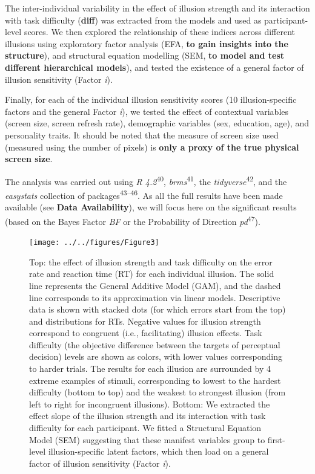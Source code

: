 \documentclass[
  man,floatsintext]{apa6}
\begin{document}
The inter-individual variability in the effect of illusion strength and its interaction with task difficulty (\textbf{diff}) was extracted from the models and used as participant-level scores. We then explored the relationship of these indices across different illusions using exploratory factor analysis (EFA, \textbf{to gain insights into the structure}), and structural equation modelling (SEM, \textbf{to model and test different hierarchical models}), and tested the existence of a general factor of illusion sensitivity (Factor \emph{i}).

Finally, for each of the individual illusion sensitivity scores (10 illusion-specific factors and the general Factor \emph{i}), we tested the effect of contextual variables (screen size, screen refresh rate), demographic variables (sex, education, age), and personality traits. It should be noted that the measure of screen size used (measured using the number of pixels) is \textbf{only a proxy of the true physical screen size}.

The analysis was carried out using \emph{R 4.2}\textsuperscript{40}, \emph{brms}\textsuperscript{41}, the \emph{tidyverse}\textsuperscript{42}, and the \emph{easystats} collection of packages\textsuperscript{43--46}. As all the full results have been made available (see \textbf{Data Availability}), we will focus here on the significant results
(based on the Bayes Factor \emph{BF} or the Probability of Direction \emph{pd}\textsuperscript{47}).

\begin{figure}
\texttt{[image: ../../figures/Figure3]} \caption{Top: the effect of illusion strength and task difficulty on the error rate and reaction time (RT) for each individual illusion. The solid line represents the General Additive Model (GAM), and the dashed line corresponds to its approximation via linear models. Descriptive data is shown with stacked dots (for which errors start from the top) and distributions for RTs. Negative values for illusion strength correspond to congruent (i.e., facilitating) illusion effects. Task difficulty (the objective difference between the targets of perceptual decision) levels are shown as colors, with lower values corresponding to harder trials. The results for each illusion are surrounded by 4 extreme examples of stimuli, corresponding to lowest to the hardest difficulty (bottom to top) and the weakest to strongest illusion (from left to right for incongruent illusions). Bottom: We extracted the effect slope of the illusion strength and its interaction with task difficulty for each participant. We fitted a Structural Equation Model (SEM) suggesting that these manifest variables group to first-level illusion-specific latent factors, which then load on a general factor of illusion sensitivity (Factor \textit{i}).}\label{fig:unnamed-chunk-4}
\end{figure}
\end{document}
